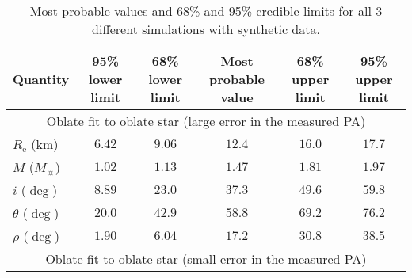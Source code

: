 \documentclass{aa}
\newcommand{\req}{R_{\mathrm{e}}}
\newcommand{\msun}{{M}_{\sun}}
\begin{document}
\begin{table*}
\begin{center}
\begin{minipage}{200mm}
\caption{Most probable values and 68\% and 95\% credible limits for all 3 different simulations with synthetic data.}
\label{table:conflimits}
\begin{tabular}{l c c c c c}
\hline\hline
Quantity & 95\% lower limit & 68\% lower limit & Most probable value& 68\% upper limit & 95\% upper limit \\ \hline   
\multicolumn{6}{c}{Oblate fit to oblate star (large error in the measured PA)} \\ %
      $\req$ (km) & $6.42$ & $9.06$ & $12.4$ & $16.0$ & $17.7$  \\ %
      $M$ ($\msun$) & $1.02$ & $1.13$ & $1.47$ & $1.81$ & $1.97$  \\ %
      $i$ ($\deg$) & $8.89$ & $23.0$ & $37.3$ & $49.6$ & $59.8$ \\ %
      $\theta$ ($\deg$) & $20.0$ & $42.9$ & $58.8$ & $69.2$ & $76.2$ \\ %
      $\rho$ ($\deg$) & $1.90$ & $6.04$ & $17.2$ & $30.8$ & $38.5$ \\ %
     \multicolumn{6}{c}{Oblate fit to oblate star (small error in the measured PA)} \\ %

\end{tabular}
\end{minipage}
\end{center}
\end{table*}
\end{document}
